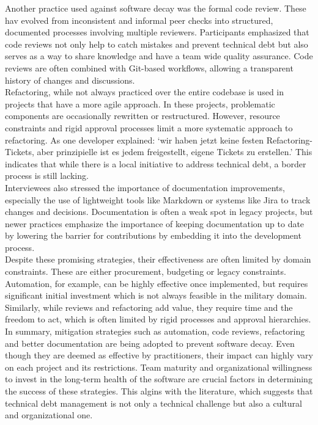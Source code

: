 Another practice used against software decay was the formal code review. These hav evolved from inconsistent and informal peer checks into structured, documented processes involving multiple reviewers. Participants emphasized that code reviews not only help to catch mistakes and prevent technical debt but also
serves as a way to share knowledge and have a team wide quality assurance. Code reviews are often combined with Git-based workflows, allowing a transparent history of changes and discussions.\\

Refactoring, while not always practiced over the entire codebase is used in projects that have a more agile approach. In these projects, problematic components are occasionally rewritten or restructured. However, resource constraints and rigid approval processes limit a more systematic approach to refactoring.
As one developer explained: `wir haben jetzt keine festen Refactoring-Tickets, aber prinzipielle ist es jedem freigestellt, eigene Tickets zu erstellen.' This indicates that while there is a local initiative to address technical debt, a border process is still lacking.\\

Interviewees also stressed the importance of documentation improvements, especially the use of lightweight tools like Markdown or systems like Jira to track changes and decisions. Documentation is often a weak spot in legacy projects, but newer practices 
emphasize the importance of keeping documentation up to date by lowering the barrier for contributions by embedding it into the development process.\\

Despite these promising strategies, their effectiveness are often limited by domain constraints. These are either procurement, budgeting or legacy constraints. Automation, for example, can be highly effective once implemented, but requires significant initial investment which is not always feasible in the military domain.
Similarly, while reviews and refactoring add value, they require time and the freedom to act, which is often limited by rigid processes and approval hierarchies.\\

In summary, mitigation strategies such as automation, code reviews, refactoring and better documentation are being adopted to prevent software decay. Even though they are deemed as effective by practitioners, their impact can highly vary on each project and its restrictions. Team maturity and organizational
willingness to invest in the long-term health of the software are crucial factors in determining the success of these strategies. This algins with the literature, which suggests that technical debt management is not only a technical challenge but also a cultural and organizational one.\\

